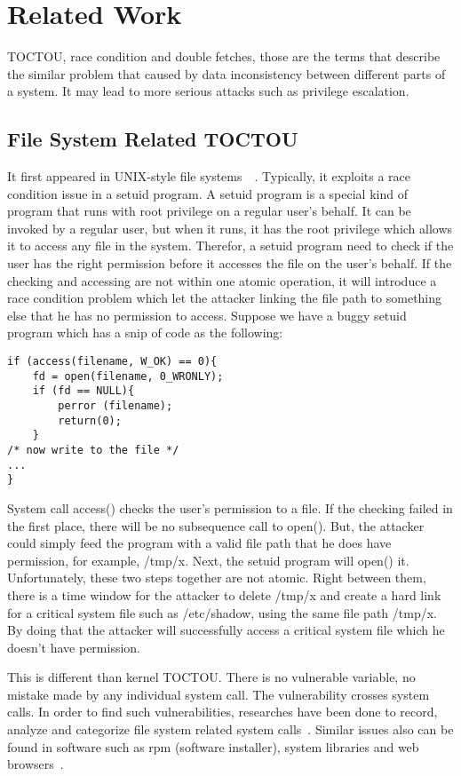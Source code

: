 \section{Related Work}
\label{sec:relatedwork}
TOCTOU, race condition and double fetches, those are the terms that describe the similar problem that caused by data inconsistency between different parts of a system. It may lead to more serious attacks such as privilege escalation.

\subsection{File System Related TOCTOU}
It first appeared in UNIX-style file systems~\cite{bishop1996checking}~\cite{bishop1995race}. Typically, it exploits a race condition issue in a setuid program. A setuid program is a special kind of program that runs with root privilege on a regular user's behalf. It can be invoked by a regular user, but when it runs, it has the root privilege which allows it to access any file in the system. Therefor, a setuid program need to check if the user has the right permission before it accesses the file on the user's behalf. If the checking and accessing are not within one atomic operation, it will introduce a race condition problem which let the attacker linking the file path to something else that he has no permission to access. Suppose we have a buggy setuid program  which has a snip of code as the following:

\begin{lstlisting}[basicstyle=\small,style=base] 
if (access(filename, W_OK) == 0){
	fd = open(filename, 0_WRONLY);
	if (fd == NULL){
		perror (filename);
		return(0);
	}
/* now write to the file */
...
}
\end{lstlisting}

System call access() checks the user's permission to a file. If the checking failed in the first place, there will be no subsequence call to open(). But, the attacker could simply feed the program with a valid file path that he does have permission, for example, /tmp/x. Next, the setuid program will open() it. Unfortunately, these two steps together are not atomic. Right between them, there is a time window for the attacker to delete /tmp/x and create a hard link for a critical system file such as /etc/shadow, using the same file path /tmp/x. By doing that the attacker will successfully access a critical system file which he doesn't have permission.

This is different than kernel TOCTOU. There is no vulnerable variable, no mistake made by 
any individual system call. The vulnerability crosses system calls. In order to find such vulnerabilities, researches have been done to record, analyze and categorize file system related system calls~\cite{wei2005tocttou}. Similar issues also  can be found in software such as rpm (software installer), system libraries and web browsers~\cite{yang2012concurrency}.

